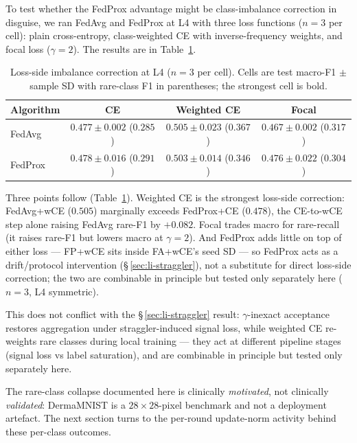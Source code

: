 \documentclass[11pt,a4paper]{report}
\begin{document}
To test whether the FedProx advantage might be class-imbalance correction
in disguise, we ran FedAvg and FedProx at L4 with three loss functions
($n=3$ per cell): plain cross-entropy, class-weighted CE with
inverse-frequency weights, and focal loss ($\gamma = 2$). The results are
in Table~\ref{tab:loss-side}.

\begin{table}[H]
\centering
\caption{Loss-side imbalance correction at L4 ($n=3$ per cell). Cells are
test macro-F1 $\pm$ sample SD with rare-class F1 in parentheses; the strongest
cell is bold.}
\label{tab:loss-side}
\begin{tabular}{lccc}
\toprule
Algorithm & CE & Weighted CE & Focal \\
\midrule
FedAvg  & $0.477 \pm 0.002$ ($0.285$) & $\mathbf{0.505 \pm 0.023}$ ($\mathbf{0.367}$) & $0.467 \pm 0.002$ ($0.317$) \\
FedProx & $0.478 \pm 0.016$ ($0.291$) & $0.503 \pm 0.014$ ($0.346$)                   & $0.476 \pm 0.022$ ($0.304$) \\
\bottomrule
\end{tabular}
\end{table}

Three points follow (Table~\ref{tab:loss-side}). Weighted CE is the strongest
loss-side correction: FedAvg+wCE ($0.505$) marginally exceeds FedProx+CE
($0.478$), the CE-to-wCE step alone raising FedAvg rare-F1 by $+0.082$. Focal
trades macro for rare-recall (it raises rare-F1 but lowers macro at $\gamma=2$).
And FedProx adds little on top of either loss --- FP+wCE sits inside FA+wCE's
seed SD --- so FedProx acts as a drift/protocol intervention
(\S\,\ref{sec:li-straggler}), not a substitute for direct loss-side correction;
the two are combinable in principle but tested only separately here ($n=3$, L4
symmetric).

This does not conflict with the \S\,\ref{sec:li-straggler} result:
$\gamma$-inexact acceptance restores aggregation under straggler-induced signal
loss, while weighted CE re-weights rare classes during local training --- they
act at different pipeline stages (signal loss vs label saturation), and are
combinable in principle but tested only separately here.

The rare-class collapse documented here is clinically \emph{motivated},
not clinically \emph{validated}: DermaMNIST is a $28 \times 28$-pixel
benchmark and not a deployment artefact. The next section turns to the
per-round update-norm activity behind these per-class outcomes.
\end{document}
